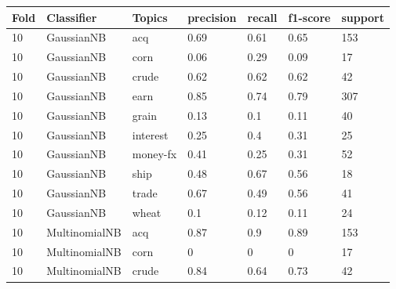 \documentclass{article}
\begin{document}
\begin{table}[h]
\begin{tabular}{lllllll}
\textbf{Fold} & \textbf{Classifier}    & \textbf{Topics} & \textbf{precision} & \textbf{recall} & \textbf{f1-score} & \textbf{support} \\ \hline
10            & GaussianNB             & acq             & 0.69               & 0.61            & 0.65              & 153              \\
10            & GaussianNB             & corn            & 0.06               & 0.29            & 0.09              & 17               \\
10            & GaussianNB             & crude           & 0.62               & 0.62            & 0.62              & 42               \\
10            & GaussianNB             & earn            & 0.85               & 0.74            & 0.79              & 307              \\
10            & GaussianNB             & grain           & 0.13               & 0.1             & 0.11              & 40               \\
10            & GaussianNB             & interest        & 0.25               & 0.4             & 0.31              & 25               \\
10            & GaussianNB             & money-fx        & 0.41               & 0.25            & 0.31              & 52               \\
10            & GaussianNB             & ship            & 0.48               & 0.67            & 0.56              & 18               \\
10            & GaussianNB             & trade           & 0.67               & 0.49            & 0.56              & 41               \\
10            & GaussianNB             & wheat           & 0.1                & 0.12            & 0.11              & 24               \\
10            & MultinomialNB          & acq             & 0.87               & 0.9             & 0.89              & 153              \\
10            & MultinomialNB          & corn            & 0                  & 0               & 0                 & 17               \\
10            & MultinomialNB          & crude           & 0.84               & 0.64            & 0.73              & 42               \\

\end{tabular}
\end{table}
\end{document}
